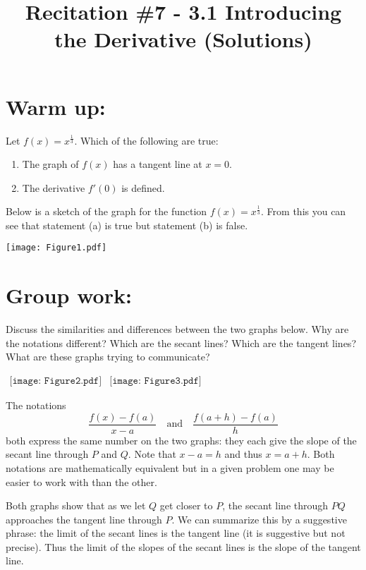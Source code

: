 \documentclass[nooutcomes]{ximera}
\title{Recitation \#7 - 3.1 Introducing the Derivative (Solutions)}
\begin{document}
\begin{abstract}		\end{abstract}
\maketitle

\section*{Warm up:} 
Let $f(x) = x^{\frac{1}{3}}$.  Which of the following are true:
	
	\begin{enumerate}
	
	\item The graph of $f(x)$ has a tangent line at $x=0$.
	
	\item The derivative $f'(0)$ is defined.
	
	\end{enumerate}

		\begin{freeResponse}
		Below is a sketch of the graph for the function $f(x) = x^{\frac{1}{3}}$.  From this you can see that statement (a) is true but statement (b) is false.
			\begin{image}
			\texttt{[image: Figure1.pdf]}
			\end{image}
		\end{freeResponse}
	
	

\section*{Group work:}

\begin{problem}
Discuss the similarities and differences between the two graphs below.  Why are the notations different?  Which are the secant lines?  Which are the tangent lines?  What are these graphs trying to communicate?

	$\begin{array}{lr}
		\texttt{[image: Figure2.pdf]}
		&
		\texttt{[image: Figure3.pdf]}
	\end{array}$

			\begin{freeResponse}
			The notations 
			$$\frac{f(x)-f(a)}{x-a} \quad \text{and} \quad \frac{f(a+h)-f(a)}{h}$$
			 both express the same number on the two graphs: they each give the slope of the secant line through $P$ 				and $Q$.  Note that $x-a=h$ and thus $x=a+h$.  Both notations are mathematically equivalent but in a given problem one may be easier to work with than the other.  

			Both graphs show that as we let $Q$ get closer to $P$, the secant line through $PQ$ approaches the tangent line through $P$.  We can summarize this by a suggestive 				phrase: the limit of the secant lines is the tangent line (it is suggestive but not precise).  Thus the limit of the slopes of the secant lines is the slope of the tangent line.
			\end{freeResponse}
\end{problem}
	
\end{document}
